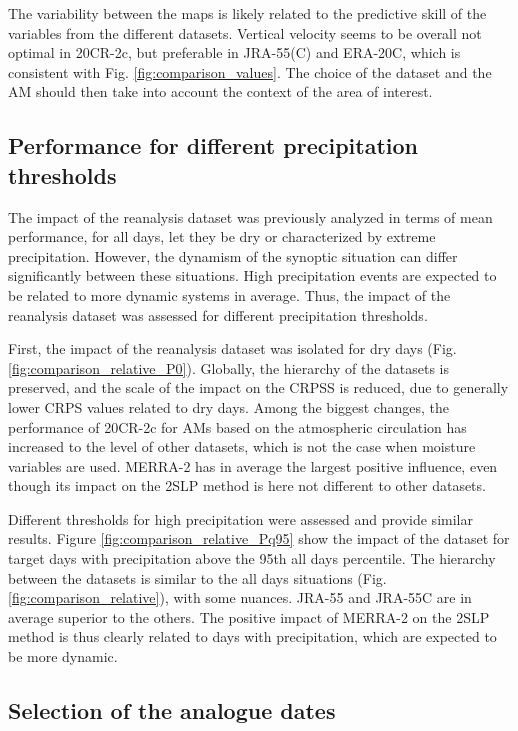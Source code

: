 \documentclass{ametsoc}
\begin{document}
The variability between the maps is likely related to the predictive skill of the variables from the different datasets. Vertical velocity seems to be overall not optimal in 20CR-2c, but preferable in JRA-55(C) and ERA-20C, which is consistent with Fig. \ref{fig:comparison_values}. The choice of the dataset and the AM should then take into account the context of the area of interest.


\subsection{Performance for different precipitation thresholds}

The impact of the reanalysis dataset was previously analyzed in terms of mean performance, for all days, let they be dry or characterized by extreme precipitation. However, the dynamism of the synoptic situation can differ significantly between these situations. High precipitation events are expected to be related to more dynamic systems in average. Thus, the impact of the reanalysis dataset was assessed for different precipitation thresholds.

First, the impact of the reanalysis dataset was isolated for dry days (Fig. \ref{fig:comparison_relative_P0}). Globally, the hierarchy of the datasets is preserved, and the scale of the impact on the CRPSS is reduced, due to generally lower CRPS values related to dry days. Among the biggest changes, the performance of 20CR-2c for AMs based on the atmospheric circulation has increased to the level of other datasets, which is not the case when moisture variables are used. MERRA-2 has in average the largest positive influence, even though its impact on the 2SLP method is here not different to other datasets.

Different thresholds for high precipitation were assessed and provide similar results. Figure \ref{fig:comparison_relative_Pq95} show the impact of the dataset for target days with precipitation above the 95th all days percentile. The hierarchy between the datasets is similar to the all days situations (Fig. \ref{fig:comparison_relative}), with some nuances. JRA-55 and JRA-55C are in average superior to the others. The positive impact of MERRA-2 on the 2SLP method is thus clearly related to days with precipitation, which are expected to be more dynamic.


\subsection{Selection of the analogue dates}
\end{document}
